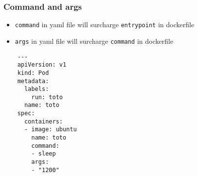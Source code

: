 \subsubsection{Command and args}
\begin{frame}[fragile]{\subsubsecname}
  \begin{itemize}
    \item \texttt{command} in yaml file will surcharge \texttt{entrypoint} in dockerfile
    \item \texttt{args} in yaml file will surcharge \texttt{command} in dockerfile
  \end{itemize}
  \begin{lstlisting}
    ---
    apiVersion: v1
    kind: Pod
    metadata:
      labels:
        run: toto
      name: toto
    spec:
      containers:
      - image: ubuntu
        name: toto
        command:
        - sleep
        args:
        - "1200"
\end{lstlisting}
\end{frame}

